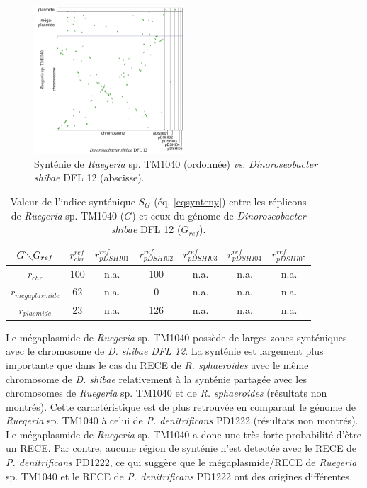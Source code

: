 \begin{figure}[H]
   \begin{center}
   \includegraphics[width=0.5\textwidth]{./img/synteny/new/fig8_4.png}
   \caption[Synténie de \textit{Ruegeria} \textit{vs.} \textit{D. shibae} ]{Synténie de \textit{Ruegeria} sp. TM1040 (ordonnée) \textit{vs.} \textit{Dinoroseobacter shibae}  DFL 12 (abscisse).}\label{figsyntruegdino}
   \end{center}
\end{figure}     
  
\begin{table}[H]
	\begin{center}
	\caption[Valeurs de l'indice synténique pour \textit{Ruegeria}]{Valeur de l'indice synténique $S_{G}$ (éq. \ref{eqsynteny}) entre les réplicons de \textit{Ruegeria} sp. TM1040 ($G$) et ceux du génome de \textit{Dinoroseobacter shibae} DFL 12 ($G_{ref}$).}\label{tablesyntrug}
		\begin{tabular}{c|cccccc}
		$G \diagdown G_{ref}$ & $r^{ref}_{chr}$ & $r^{ref}_{pDSHI01}$ & $r^{ref}_{pDSHI02}$ & $r^{ref}_{pDSHI03}$ & $r^{ref}_{pDSHI04}$ & $r^{ref}_{pDSHI05}$\\
		\hline
		$r_{chr}$ & 100 & n.a. & 100 & n.a. & n.a. & n.a.\\
   		$ r_{megaplasmide}$ & 62 & n.a. & 0 & n.a. & n.a. & n.a.\\
  		$r_{plasmide}$ & 23 & n.a. & 126 & n.a. & n.a. & n.a.\\ 
		\end{tabular}
	\end{center}
\end{table}
   
   Le mégaplasmide de \textit{Ruegeria} sp. TM1040 possède de larges zones synténiques avec le chromosome de \textit{D. shibae DFL 12}. La synténie est largement plus importante que dans le cas du RECE de \textit{R. sphaeroides} avec le même chromosome de \textit{D. shibae} relativement à la synténie partagée avec les chromosomes de \textit{Ruegeria} sp. TM1040 et de \textit{R. sphaeroides} (résultats non montrés). Cette caractéristique est de plus retrouvée en comparant le génome de \textit{Ruegeria} sp. TM1040 à celui de \textit{P. denitrificans} PD1222 (résultats non montrés). Le mégaplasmide de \textit{Ruegeria} sp. TM1040 a donc une très forte probabilité d'être un RECE. Par contre, aucune région de synténie n'est detectée avec le RECE de \textit{P. denitrificans} PD1222, ce qui suggère que le mégaplasmide/RECE de \textit{Ruegeria} sp. TM1040 et le RECE de \textit{P. denitrificans} PD1222 ont des origines différentes.


